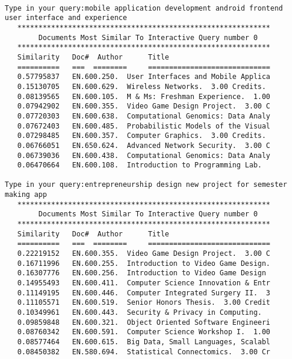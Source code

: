 \documentclass[twoside]{article}
\begin{document}
\begin{verbatim}

Type in your query:mobile application development android frontend user interface and experience
   ************************************************************
        Documents Most Similar To Interactive Query number 0       
   ************************************************************
   Similarity   Doc#  Author      Title                        
   ==========   ===  ========     =============================
   0.57795837   EN.600.250.  User Interfaces and Mobile Applica
   0.15130705   EN.600.629.  Wireless Networks.  3.00 Credits.
   0.08139565   EN.600.105.  M & Ms: Freshman Experience.  1.00
   0.07942902   EN.600.355.  Video Game Design Project.  3.00 C
   0.07720303   EN.600.638.  Computational Genomics: Data Analy
   0.07672403   EN.600.485.  Probabilistic Models of the Visual
   0.07298485   EN.600.357.  Computer Graphics.  3.00 Credits.
   0.06766051   EN.650.624.  Advanced Network Security.  3.00 C
   0.06739036   EN.600.438.  Computational Genomics: Data Analy
   0.06470664   EN.600.108.  Introduction to Programming Lab.  

Type in your query:entrepreneurship design new project for semester making app
   ************************************************************
        Documents Most Similar To Interactive Query number 0       
   ************************************************************
   Similarity   Doc#  Author      Title                        
   ==========   ===  ========     =============================
   0.22219152   EN.600.355.  Video Game Design Project.  3.00 C
   0.16711996   EN.600.255.  Introduction to Video Game Design.
   0.16307776   EN.600.256.  Introduction to Video Game Design 
   0.14955493   EN.600.411.  Computer Science Innovation & Entr
   0.11149195   EN.600.446.  Computer Integrated Surgery II.  3
   0.11105571   EN.600.519.  Senior Honors Thesis.  3.00 Credit
   0.10349961   EN.600.443.  Security & Privacy in Computing.  
   0.09859848   EN.600.321.  Object Oriented Software Engineeri
   0.08760342   EN.600.591.  Computer Science Workshop I.  1.00
   0.08577464   EN.600.615.  Big Data, Small Languages, Scalabl
   0.08450382   EN.580.694.  Statistical Connectomics.  3.00 Cr
   


\end{verbatim}
\end{document}
